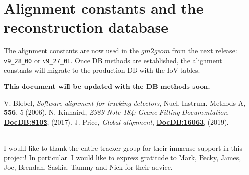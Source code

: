 \documentclass[12pt]{article}
\begin{document}
\section{Alignment constants and the reconstruction database}
The alignment constants are now used in the $gm2geom$ from the next release: \verb!v9_28_00! or \verb!v9_27_01!. Once DB methods are established, the alignment constants will migrate to the production DB with the IoV tables. 

\textbf{This document will be updated with the DB methods soon.}

\begin{thebibliography}{99}
\footnotesize
{} V. Blobel, \textit{Software alignment for tracking detectors}, Nucl. Instrum. Methods A, \textbf{556}, 5 (2006).
 N. Kinnaird, \textit{E989 Note 184: Geane Fitting Documentation}, \textbf{\href{https://gm2-docdb.fnal.gov/cgi-bin/private/ShowDocument?docid=8102}{DocDB:8102}}, (2017).
 J. Price, \textit{Global alignment}, \textbf{\href{https://gm2-docdb.fnal.gov/cgi-bin/private/ShowDocument?docid=16063}{DocDB:16063}}, (2019).


\end{thebibliography}

\def\Acknowledgements{
\setlength{\parskip}{0.3cm}\setlength{\parindent}{0.0cm}
     \bigskip\bigskip      {\Large {\bf Acknowledgements}} \bigskip}
\def\speaker#1{{\bf #1:}\ }
\def\endAcknowledgements{}

\Acknowledgements \\
I would like to thank the entire tracker group for their immense support in this project! In particular, I would like to express gratitude to Mark, Becky, James, Joe, Brendan, Saskia, Tammy and Nick for their advice.
\endAcknowledgements
 
\end{document}
